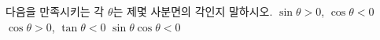 다음을 만족시키는 각 $\theta$는 제몇 사분면의 각인지 말하시오.
 $\sin\theta>0$, $\cos\theta<0$
 $\cos\theta>0$, $\tan\theta<0$
 $\sin\theta\cos\theta<0$
